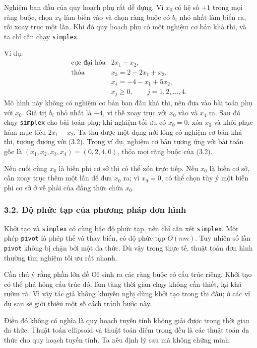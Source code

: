 \documentclass[11pt]{article}
\begin{document}
Nghiệm ban đầu của quy hoạch phụ rất dễ dựng. Vì \(x_0\) có hệ số \(+1\) trong
mọi ràng buộc, chọn \(x_0\) làm biến vào và chọn ràng buộc có \(b_i\) nhỏ nhất
làm biến ra, rồi xoay trục một lần. Khi đó quy hoạch phụ có một nghiệm cơ bản
khả thi, và ta chỉ cần chạy \texttt{simplex}.

Ví dụ:
\[
\begin{array}{ll}
\text{cực đại hóa} & 2x_1-x_2,\\
\text{thỏa} & x_3=2-2x_1+x_2,\\
& x_4=-4-x_1+5x_2,\\
& x_j\ge 0,\qquad j=1,2,\ldots,4.
\end{array}\tag{3.2}
\]
Mô hình này không có nghiệm cơ bản ban đầu khả thi, nên đưa vào bài toán phụ
với \(x_0\). Giá trị \(b_i\) nhỏ nhất là \(-4\), vì thế xoay trục với \(x_0\)
vào và \(x_4\) ra. Sau đó chạy \texttt{simplex} cho bài toán phụ; khi nghiệm
tối ưu có \(x_0=0\), xóa \(x_0\) và khôi phục hàm mục tiêu \(2x_1-x_2\). Ta
thu được một dạng nới lỏng có nghiệm cơ bản khả thi, tương đương với (3.2).
Trong ví dụ, nghiệm cơ bản tương ứng với bài toán gốc là
\((x_1,x_2,x_3,x_4)=(0,2,4,0)\), thỏa mọi ràng buộc của (3.2).

Nếu cuối cùng \(x_0\) là biến phi cơ sở thì có thể xóa trực tiếp. Nếu \(x_0\)
là biến cơ sở, cần xoay trục thêm một lần để đưa \(x_0\) ra; vì \(x_0=0\), có
thể chọn tùy ý một biến phi cơ sở ở vế phải của đẳng thức chứa \(x_0\).

\subsubsection*{3.2. Độ phức tạp của phương pháp đơn hình}

Khởi tạo và \texttt{simplex} có cùng bậc độ phức tạp, nên chỉ cần xét
\texttt{simplex}. Một phép \texttt{pivot} là phép thế và thay biến, có độ phức
tạp \(O(nm)\). Tuy nhiên số lần \texttt{pivot} không bị chặn bởi một đa thức.
Dù vậy trong thực tế, thuật toán đơn hình thường tìm nghiệm tối ưu rất nhanh.

Cần chú ý rằng phần lớn đề OI sinh ra các ràng buộc có cấu trúc riêng. Khởi
tạo có thể phá hỏng cấu trúc đó, làm tăng thời gian chạy không cần thiết, lại
khá rườm rà. Vì vậy tác giả không khuyến nghị dùng khởi tạo trong thi đấu; ở
các ví dụ sau sẽ giới thiệu một số cách tránh bước này.

Điều đó không có nghĩa là quy hoạch tuyến tính không giải được trong thời
gian đa thức. Thuật toán ellipsoid và thuật toán điểm trong đều là các thuật
toán đa thức cho quy hoạch tuyến tính. Ta nêu định lý sau mà không chứng minh:
\end{document}
